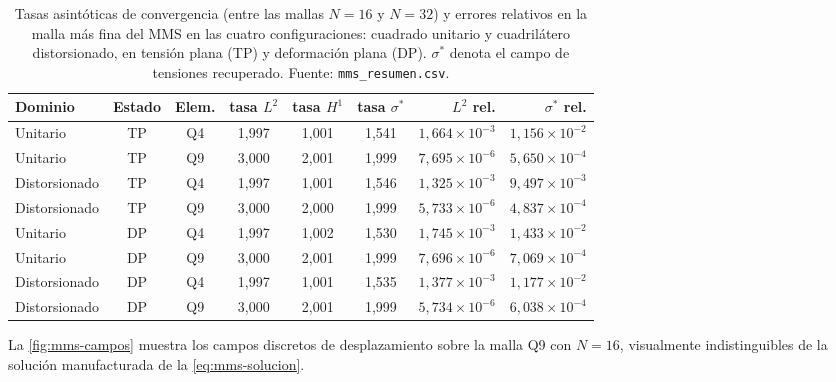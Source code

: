 \begin{table}[htbp]
\centering
\caption[Tasas asintóticas del MMS en las cuatro configuraciones.]{Tasas asintóticas de convergencia (entre las mallas $N=16$ y $N=32$) y errores relativos en la malla más fina del MMS en las cuatro configuraciones: cuadrado unitario y cuadrilátero distorsionado, en tensión plana (TP) y deformación plana (DP). $\sigma^*$ denota el campo de tensiones recuperado. Fuente: \texttt{mms\_resumen.csv}.}
\label{tab:mms-configs}
\small
\setlength{\tabcolsep}{4pt}
\begin{tabular}{l c c c c c r r}
\hline
Dominio & Estado & Elem. & tasa $L^2$ & tasa $H^1$ & tasa $\sigma^*$ & $L^2$ rel. & $\sigma^*$ rel. \\
\hline
Unitario      & TP & Q4 & 1,997 & 1,001 & 1,541 & $1{,}664\times10^{-3}$ & $1{,}156\times10^{-2}$ \\
Unitario      & TP & Q9 & 3,000 & 2,001 & 1,999 & $7{,}695\times10^{-6}$ & $5{,}650\times10^{-4}$ \\
Distorsionado & TP & Q4 & 1,997 & 1,001 & 1,546 & $1{,}325\times10^{-3}$ & $9{,}497\times10^{-3}$ \\
Distorsionado & TP & Q9 & 3,000 & 2,000 & 1,999 & $5{,}733\times10^{-6}$ & $4{,}837\times10^{-4}$ \\
Unitario      & DP & Q4 & 1,997 & 1,002 & 1,530 & $1{,}745\times10^{-3}$ & $1{,}433\times10^{-2}$ \\
Unitario      & DP & Q9 & 3,000 & 2,001 & 1,999 & $7{,}696\times10^{-6}$ & $7{,}069\times10^{-4}$ \\
Distorsionado & DP & Q4 & 1,997 & 1,001 & 1,535 & $1{,}377\times10^{-3}$ & $1{,}177\times10^{-2}$ \\
Distorsionado & DP & Q9 & 3,000 & 2,001 & 1,999 & $5{,}734\times10^{-6}$ & $6{,}038\times10^{-4}$ \\
\hline
\end{tabular}
\end{table}

La \autoref{fig:mms-campos} muestra los campos discretos de desplazamiento sobre la malla Q9 con $N=16$, visualmente indistinguibles de la solución manufacturada de la \autoref{eq:mms-solucion}.

